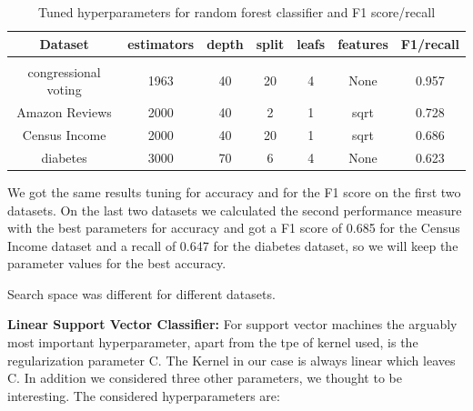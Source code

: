 \documentclass[a4paper,12pt]{article}
\begin{document}
\begin{table}[h!]
    \centering
    \begin{tabular}{|c|c|c|c|c|c|c|}
    \hline
    Dataset & \textsf{estimators} & \textsf{depth} & \textsf{split} & \textsf{leafs} & \textsf{features} & F1/recall \\
    \hline
    \multicolumn{7}{c}{\vspace{-0.4cm}} \\ %
    \hline
    congressional voting & 1963 & 40 & 20 & 4 & None & 0.957 \\%
    \hline
    Amazon Reviews & 2000 & 40 & 2 & 1 & sqrt & 0.728 \\%
    \hline
    Census Income & 2000 & 40 & 20 & 1 & sqrt & 0.686 \\%
    \hline
    diabetes & 3000 & 70 & 6 & 4 & None & 0.623 \\%
    \hline
    \end{tabular}
    \caption{Tuned hyperparameters for random forest classifier and F1 score/recall} 
    \label{table:tu_hyp_rf_f1}
    \end{table}

We got the same results tuning for accuracy and for the F1 score on the first two datasets. On the last two datasets we calculated the second performance measure with the best parameters for accuracy and got a F1 score of 0.685 for the Census Income dataset and a recall of 0.647 for the diabetes dataset, so we will keep the parameter values for the best accuracy.

Search space was different for different datasets.


\textbf{Linear Support Vector Classifier:} For support vector machines the arguably most important hyperparameter, apart from the tpe of kernel used, is the regularization parameter \textsf{C}. The Kernel in our case is always linear which leaves \textsf{C}. In addition we considered three other parameters, we thought to be interesting. The considered hyperparameters are:
\end{document}
